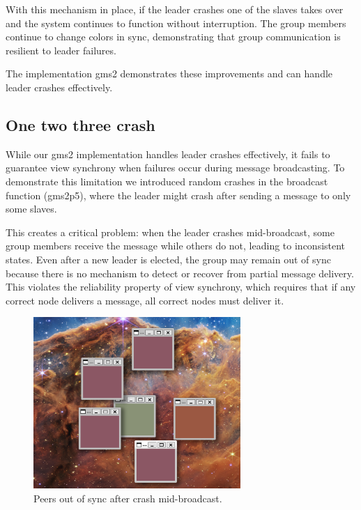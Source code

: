 \documentclass[a4paper, 11pt]{article}
\begin{document}
With this mechanism in place, if the leader crashes one of the slaves takes over and the system continues to function without interruption. The group members continue to change colors in sync, demonstrating that group communication is resilient to leader failures.

The implementation gms2 demonstrates these improvements and can handle leader crashes effectively.

\subsection{One two three crash}

While our gms2 implementation handles leader crashes effectively, it fails to guarantee view synchrony when failures occur during message broadcasting. To demonstrate this limitation we introduced random crashes in the broadcast function (gms2p5), where the leader might crash after sending a message to only some slaves.

This creates a critical problem: when the leader crashes mid-broadcast, some group members receive the message while others do not, leading to inconsistent states. Even after a new leader is elected, the group may remain out of sync because there is no mechanism to detect or recover from partial message delivery. This violates the reliability property of view synchrony, which requires that if any correct node delivers a message, all correct nodes must deliver it.

\begin{figure}[H]
  \centering
  \includegraphics[width=0.7\textwidth]{imgs/out_of_sync.png}
  \caption{Peers out of sync after crash mid-broadcast.}
  \label{fig:out_of_sync}
\end{figure}
\end{document}
